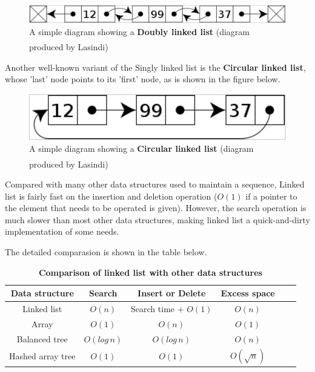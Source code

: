 \documentclass[cn,black,12pt,normal]{elegantnote}
\newcommand{\uct}[1]{\textsuperscript{\textsuperscript{\cite{#1}}}}
\begin{document}
\begin{figure}[H]
    \centering
    \includegraphics[width=1.0\linewidth]{image/ll_02.jpg}
    \caption{A simple diagram showing a \textbf{Doubly linked list} (diagram produced by Lasindi)\uct{wiki:Linked_list}}
\end{figure}

Another well-known variant of the Singly linked list is the \textbf{Circular linked list}, whose 'last' node points to its 'first' node, as is shown in the figure below.

\begin{figure}[H]
    \centering
    \includegraphics[width=1.0\linewidth]{image/ll_03.jpg}
    \caption{A simple diagram showing a \textbf{Circular linked list} (diagram produced by Lasindi)\uct{wiki:Linked_list}}
\end{figure}


Compared with many other data structures used to maintain a sequence, Linked list is fairly fast on the insertion and deletion operation ($O(1)$ if a pointer to the element that needs to be operated is given). However, the search operation is much slower than most other data structures, making linked list a quick-and-dirty implementation of some needs.

The detailed comparasion is shown in the table below.

\begin{table}[H]
    \caption{\textbf{Comparison of linked list with other data structures}}
    \centering
    \begin{tabular}{cccccc}
        \toprule
        Data structure    & Search       & Insert or Delete     & Excess space  \\
        \midrule
        Linked list       & $O(n)$       & Search time + $O(1)$ & $O(n)$        \\
        Array             & $O(1)$       & $O(n)$               & $O(1)$        \\
        Balanced tree     & $O(log\, n)$ & $O(log\, n)$         & $O(n)$        \\
        Hashed array tree & $O(1)$       & $O(1)$               & $O(\sqrt{n})$ \\
        \bottomrule
    \end{tabular}
\end{table}
\end{document}
